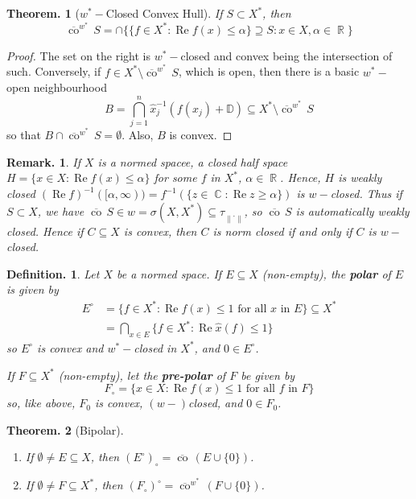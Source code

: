 \documentclass[11pt, a4paper]{memoir}
\DeclareMathOperator{\R}{{\mathbb{R}}}
\DeclareMathOperator{\C}{{\mathbb{C}}}
\newcommand{\norm}[1]{\ensuremath{\left\lVert#1\right\rVert}}
\theoremstyle{change}
\newtheorem{theorem}{Theorem.}[section]
\theoremstyle{plain}
\theoremstyle{nonumberplain}
\newtheorem{definition}{Definition.}
\newtheorem{remark}{Remark.}
\newtheorem{proof}{Proof}
\renewcommand{\Re}{\ensuremath{\operatorname{Re}}}
\newcommand{\cwx}{\ensuremath{\overline{\operatorname{co}}^{w^*}\,}}
\newcommand{\cw}{\ensuremath{\overline{\operatorname{co}}\,}}
\numberwithin{equation}{section}
\begin{document}
\begin{theorem}[$w^*-$Closed Convex Hull]
    If $S\subset X^*$, then
    \begin{equation*}
        \cwx S=\cap\{\{f\in X^*:\Re f(x)\leq \alpha\}\supseteq S:x\in X,\alpha\in\R\}
    \end{equation*}
\end{theorem}
\begin{proof}
    The set on the right is $w^*-$closed and convex being the intersection of such.
    Conversely, if $f\in X^*\setminus\cwx S$, which is open, then there is a basic $w^*-$open neighbourhood
    \begin{equation*}
        B=\bigcap_{j=1}^n\hat x_j^{-1}(f(x_j)+\mathbb{D})\subseteq X^*\setminus\cwx S
    \end{equation*}
    so that $B\cap\cwx S=\emptyset$.
    Also, $B$ is convex.
\end{proof}
\begin{remark}
    If $X$ is a normed spacee, a closed half space $H=\{x\in X:\Re f(x)\leq\alpha\}$ for some $f$ in $X^*$, $\alpha\in\R$.
    Hence, $H$ is weakly closed $(\Re f)^{-1}([\alpha,\infty))=f^{-1}(\{z\in\C:\Re z\geq\alpha\})$ is $w-$closed.
    Thus if $S\subset X$, we have $\cw S\in w=\sigma(X,X^*)\subseteq\tau_{\norm{\cdot}}$, so $\cw S$ is automatically weakly closed.
    Hence if $C\subseteq X$ is convex, then $C$ is norm closed if and only if $C$ is $w-$closed.
\end{remark}
\begin{definition}
    Let $X$ be a normed space.
    If $E\subseteq X$ (non-empty), the \textbf{polar} of $E$ is given by
    \begin{align*}
        E^\circ&=\{f\in X^*:\Re f(x)\leq 1\text{ for all $x$ in }E\}\subseteq X^*\\
               &= \bigcap_{x\in E}\{f\in X^*:\Re\hat x(f)\leq 1\}
    \end{align*}
    so $E^\circ$ is convex and $w^*-$closed in $X^*$, and $0\in E^\circ$.

    If $F\subseteq X^*$ (non-empty), let the \textbf{pre-polar} of $F$ be given by
    \begin{equation*}
        F_\circ=\{x\in X:\Re f(x)\leq 1\text{ for all $f$ in }F\}
    \end{equation*}
    so, like above, $F_0$ is convex, $(w-)$closed, and $0\in F_0$.
\end{definition}
\begin{theorem}[Bipolar]
    \begin{enumerate}[nl,r]
        \item If $\emptyset\neq E\subseteq X$, then $(E^\circ)_\circ=\cw(E\cup\{0\})$.
        \item If $\emptyset\neq F\subseteq X^*$, then $(F_\circ)^\circ=\cwx(F\cup\{0\})$.
    \end{enumerate}
\end{theorem}
\end{document}
